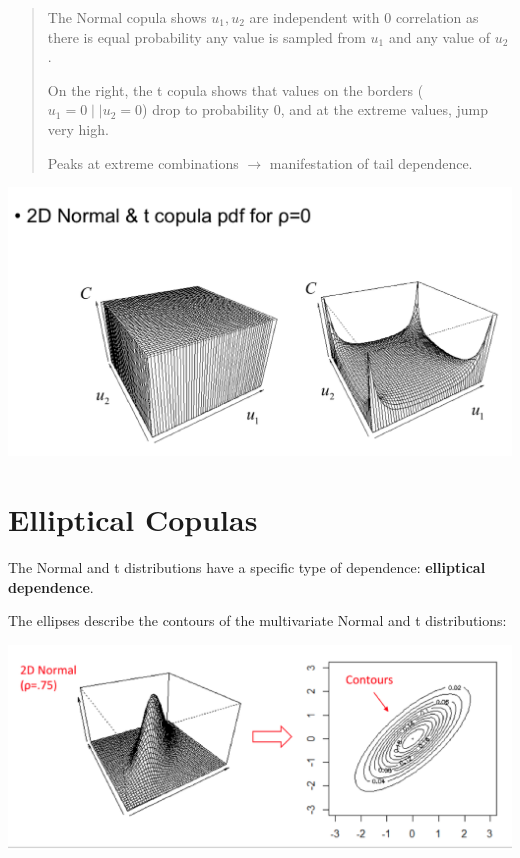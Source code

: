 \documentclass[
  oneside]{book}
\begin{document}
\begin{quote}
The Normal copula shows \(u_{1},u_{2}\) are independent with 0 correlation as there is equal probability any value is sampled from \(u_{1}\) and any value of \(u_{2}\).

On the right, the t copula shows that values on the borders (\(u_{1}=0 \mid\mid u_{2} =0\)) drop to probability 0, and at the extreme values, jump very high.

Peaks at extreme combinations \(\to\) manifestation of tail dependence.
\end{quote}

\includegraphics{Notes/Obsidian-Attachments/4-Multivariate-Return-Modelling-7.png}

\hypertarget{elliptical-copulas}{%
\section{Elliptical Copulas}\label{elliptical-copulas}}

The Normal and t distributions have a specific type of dependence: \textbf{elliptical dependence}.

The ellipses describe the contours of the multivariate Normal and t distributions:

\includegraphics{Notes/Obsidian-Attachments/4-Multivariate-Return-Modelling-8.png}
\end{document}
